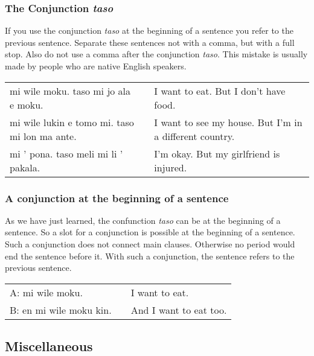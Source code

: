 \subsubsection*{The Conjunction \textit{taso} }
%
%
If you use the conjunction \textit{taso} at the beginning of a sentence you refer to the previous sentence.
Separate these sentences not with a comma, but with a full stop.
Also do not use a comma after the conjunction \textit{taso}.
This mistake is usually made by people who are native English speakers.

\begin{supertabular}{p{5,5cm}|ll}
    mi wile moku. taso mi jo ala e moku.          &  & I want to eat. But I don't have food.                   \\
    mi wile lukin e tomo mi. taso mi lon ma ante. &  & I want to see my house. But I'm in a different country. \\
    mi ' pona. taso meli mi li ' pakala.          &  & I'm okay. But my girlfriend is injured.                 \\
\end{supertabular}

%
\subsubsection*{A conjunction at the beginning of a sentence}

As we have just learned, the confunction \textit{taso} can be at the beginning of a sentence.
So a slot for a conjunction is possible at the beginning of a sentence.
Such a conjunction does not connect main clauses.
Otherwise no period would end the sentence before it.
With such a conjunction, the sentence refers to the previous sentence.

\begin{supertabular}{p{5,5cm}|ll}
    A: mi wile moku.        &  & I want to eat.         \\
    B: en mi wile moku kin. &  & And I want to eat too. \\
\end{supertabular}

%
%
%
\subsection*{Miscellaneous}
%
%
